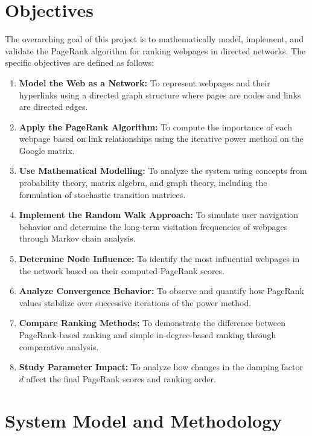 \documentclass[conference]{IEEEtran}
\begin{document}
\section{Objectives}
The overarching goal of this project is to mathematically model, implement, and validate the PageRank algorithm for ranking webpages in directed networks. The specific objectives are defined as follows:
\begin{enumerate}
    \item \textbf{Model the Web as a Network:} To represent webpages and their hyperlinks using a directed graph structure where pages are nodes and links are directed edges.
    \item \textbf{Apply the PageRank Algorithm:} To compute the importance of each webpage based on link relationships using the iterative power method on the Google matrix.
    \item \textbf{Use Mathematical Modelling:} To analyze the system using concepts from probability theory, matrix algebra, and graph theory, including the formulation of stochastic transition matrices.
    \item \textbf{Implement the Random Walk Approach:} To simulate user navigation behavior and determine the long-term visitation frequencies of webpages through Markov chain analysis.
    \item \textbf{Determine Node Influence:} To identify the most influential webpages in the network based on their computed PageRank scores.
    \item \textbf{Analyze Convergence Behavior:} To observe and quantify how PageRank values stabilize over successive iterations of the power method.
    \item \textbf{Compare Ranking Methods:} To demonstrate the difference between PageRank-based ranking and simple in-degree-based ranking through comparative analysis.
    \item \textbf{Study Parameter Impact:} To analyze how changes in the damping factor $d$ affect the final PageRank scores and ranking order.
\end{enumerate}

\section{System Model and Methodology}
\end{document}
